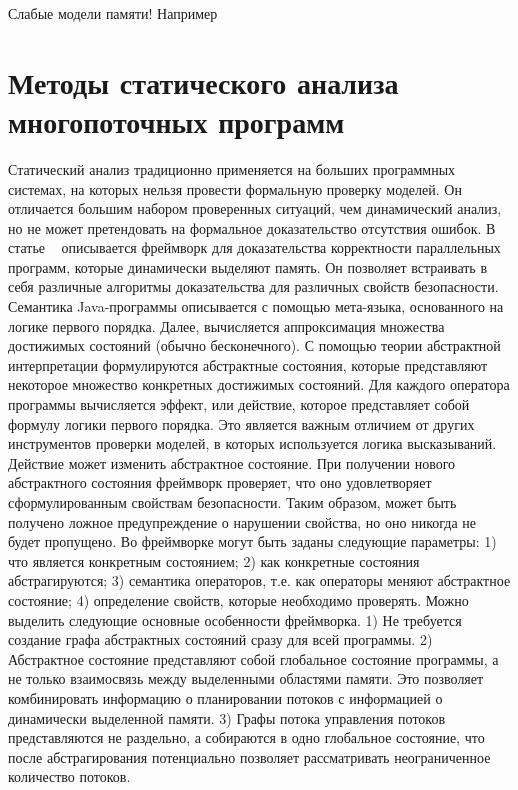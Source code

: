 Слабые модели памяти! Например ~\cite{Zhang:2015:PLDI, Zhang:2015}


\section{Методы статического анализа многопоточных программ}
\label{rw:static}
Статический анализ традиционно применяется на больших программных системах, на которых нельзя провести формальную проверку моделей. Он отличается большим набором проверенных ситуаций, чем динамический анализ, но не может претендовать на формальное доказательство отсутствия ошибок.
В статье ~\cite{Yahav:2008} описывается фреймворк для доказательства корректности параллельных программ, которые динамически выделяют память. Он позволяет встраивать в себя различные алгоритмы доказательства для различных свойств безопасности. Семантика Java-программы описывается с помощью мета-языка, основанного на логике первого порядка. Далее, вычисляется аппроксимация множества достижимых состояний (обычно бесконечного). С помощью теории абстрактной интерпретации формулируются абстрактные состояния, которые представляют некоторое множество конкретных достижимых состояний. Для каждого оператора программы вычисляется эффект, или действие, которое представляет собой формулу логики первого порядка. Это является важным отличием от других инструментов проверки моделей, в которых используется логика высказываний.
Действие может изменить абстрактное состояние. При получении нового абстрактного состояния фреймворк проверяет, что оно удовлетворяет сформулированным свойствам безопасности. Таким образом, может быть получено ложное предупреждение о нарушении свойства, но оно никогда не будет пропущено.
Во фреймворке могут быть заданы следующие параметры:
1) что является конкретным состоянием;
2) как конкретные состояния абстрагируются;
3) семантика операторов, т.е. как операторы меняют абстрактное состояние;
4) определение свойств, которые необходимо проверять.
Можно выделить следующие основные особенности фреймворка.
1) Не требуется создание графа абстрактных состояний сразу для всей программы.
2) Абстрактное состояние представляют собой глобальное состояние программы, а не только взаимосвязь между выделенными областями памяти. Это позволяет комбинировать информацию о планировании потоков с информацией о динамически выделенной памяти.
3) Графы потока управления потоков представляются не раздельно, а собираются в одно глобальное состояние, что после абстрагирования потенциально позволяет рассматривать неограниченное количество потоков.
